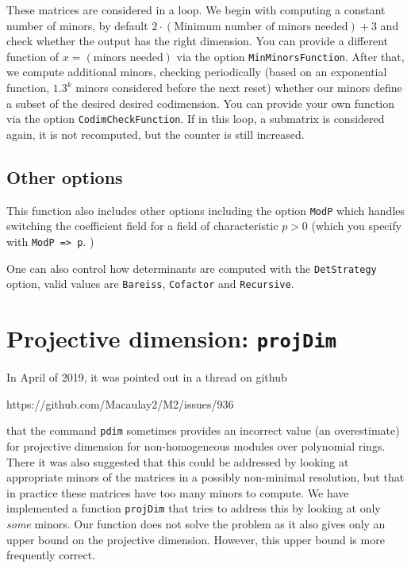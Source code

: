 \documentclass[11pt]{amsart}
\begin{document}
These matrices are considered in a loop.  We begin with computing a constant number of minors, by default $2 \cdot (\text{Minimum number of minors needed}) + 3$ and check whether the output has the right dimension.  You can provide a different function of $x = (\text{minors needed})$ via the option {\tt MinMinorsFunction}.
After that, we compute additional minors, checking periodically (based on an exponential function, $1.3^k$ minors considered before the next reset) whether our minors define a subset of the desired desired codimension.  You can provide your own function via the option {\tt CodimCheckFunction}.  If in this loop, a submatrix is considered again, it is not recomputed, but the counter is still increased.

\subsection{Other options}

This function also includes other options including the option {\tt ModP} which handles switching the coefficient field for a field of characteristic $p > 0$ (which you specify with {\tt ModP => p}. )

One can also control how determinants are computed with the {\tt DetStrategy} option, valid values are {\tt Bareiss}, {\tt Cofactor} and {\tt Recursive}.

\section{Projective dimension: {\tt projDim}}
\label{sec.ProjDim}

In April of 2019, it was pointed out in a thread on github
\begin{center}
  https://github.com/Macaulay2/M2/issues/936
\end{center}
that the command {\tt pdim} sometimes provides an incorrect value (an overestimate) for projective dimension for non-homogeneous modules over polynomial rings.  There it was also suggested that this could be addressed by looking at appropriate minors of the matrices in a possibly non-minimal resolution, but that in practice these matrices have too many minors to compute.  We have implemented a function {\tt projDim} that tries to address this by looking at only \emph{some} minors.  Our function does not solve the problem as it also gives only an upper bound on the projective dimension.  However, this upper bound is more frequently correct.
\end{document}
